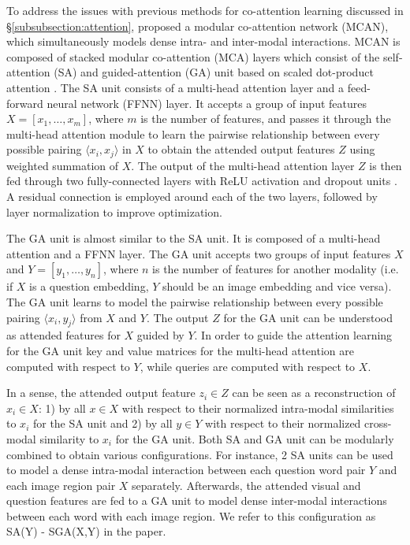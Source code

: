 \documentclass{article}
\begin{document}
To address the issues with previous methods for co-attention learning discussed in \S \ref{subsubsection:attention}, \citet{yu2019mcan} proposed a modular co-attention network (MCAN), which simultaneously models dense intra- and inter-modal interactions. MCAN is composed of stacked modular co-attention (MCA) layers which consist of the self-attention (SA) and guided-attention (GA) unit based on scaled dot-product attention \citep{transformers}. The SA unit consists of a multi-head attention layer and a feed-forward neural network (FFNN) layer. It accepts a group of input features $X = [x_{1}, \dots, x_{m}]$, where $m$ is the number of features, and passes it through the multi-head attention module to learn the pairwise relationship between every possible pairing $\langle x_{i},x_{j} \rangle$ in $X$ to obtain the attended output features $Z$ using weighted summation of $X$. The output of the multi-head attention layer $Z$ is then fed through two fully-connected layers with ReLU activation \citep{relu} and dropout units \citep{dropout}. A residual connection \citep{residual} is employed around each of the two layers, followed by layer normalization \citep{ba2016layer} to improve optimization.

The GA unit is almost similar to the SA unit. It is composed of a multi-head attention and a FFNN layer. The GA unit accepts two groups of input features $X$ and $Y = [y_{1}, \dots, y_{n}]$, where $n$ is the number of features for another modality (i.e. if $X$ is a question embedding, $Y$ should be an image embedding and vice versa). The GA unit learns to model the pairwise relationship between every possible pairing $\langle x_{i},y_{j} \rangle$ from $X$ and $Y$. The output $Z$ for the GA unit can be understood as attended features for $X$ guided by $Y$. %
In order to guide the attention learning for the GA unit key and value matrices for the multi-head attention are computed with respect to $Y$, while queries are computed with respect to $X$.

In a sense, the attended output feature $z_{i} \in Z$ can be seen as a reconstruction of $x_{i} \in X$: 1) by all $x \in X$ with respect to their normalized intra-modal similarities to $x_{i}$ for the SA unit and 2) by all $y \in Y$ with respect to their normalized cross-modal similarity to $x_{i}$ for the GA unit. Both SA and GA unit can be modularly combined to obtain various configurations. For instance, 2 SA units can be used to model a dense intra-modal interaction between each question word pair $Y$ and each image region pair $X$ separately. Afterwards, the attended visual and question features are fed to a GA unit to model dense inter-modal interactions between each word with each image region. We refer to this configuration as SA(Y) - SGA(X,Y) in the paper.
\end{document}

